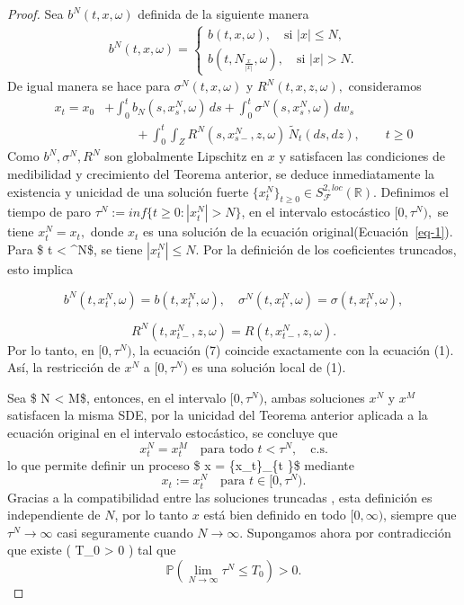 \documentclass[
  spanish,
  us-letterpaper,
]{scrreprt}
\theoremstyle{plain}
\theoremstyle{plain}
\theoremstyle{definition}
\theoremstyle{remark}
\begin{document}
\begin{proof}
Sea \(b^{N}(t,x,\omega)\) definida de la siguiente manera
\[\begin{split}
      b^{N}(t,x,\omega) = \left\lbrace\begin{array}{c}b(t,x,\omega), \quad \text{si }|x|\leq N,
       \\
       b(t,N_{\frac{x}{|x|}},\omega), \quad
       \text{si } |x| > N.\end{array}\right.
\end{split}\] De igual manera se hace para \(\sigma^{N}(t,x,\omega)\) y
\(R^{N}(t,x,z,\omega),\) consideramos \[\begin{split}
x_t = x_0 &+ \int_0^t b_N(s,x^N_s,\omega)\,ds 
           + \int_0^t \sigma^N(s,x^N_s,\omega)\,dw_s \\
          & \ \ \ \ \ \ \ \ \ \ \ +  \int_0^t\!\int_Z R^N(s,x^N_{s-},z,\omega)\,\tilde{N}_t(ds,dz),
          \qquad t\geq 0
\end{split}\] Como \(b^N, \sigma^N, R^N\) son globalmente Lipschitz en
\(x\) y satisfacen las condiciones de medibilidad y crecimiento del
Teorema anterior, se deduce inmediatamente la existencia y unicidad de
una solución fuerte
\(\{x^N_t\}_{t\geq 0}\in S^{2,loc}_{\mathcal{F}}(\mathbb{R})\).
Definimos el tiempo de paro \(\tau^N:=inf\{t\geq0:|x^N_t|> N\}\), en el
intervalo estocástico \([0, \tau^N),\) se tiene \(x^N_t=x_t,\) donde
\(x_t\) es una solución de la ecuación original(Ecuación~\ref{eq-1}).
Para \$ t \textless{} \tau\^{}N\$, se tiene \(|x_t^N| \leq N\). Por la
definición de los coeficientes truncados, esto implica

\[b^N(t,x_t^N,\omega) = b(t,x_t^N,\omega), \quad \sigma^N(t,x_t^N,\omega) = \sigma(t,x_t^N,\omega),\]

\[R^N(t,x_{t-}^N,z,\omega) = R(t,x_{t-}^N,z,\omega).\] Por lo tanto, en
\([0, \tau^N)\), la ecuación (7) coincide exactamente con la ecuación
(1). Así, la restricción de \(x^N\) a \([0, \tau^N)\) es una solución
local de (1).

Sea \$ N \textless{} M\$, entonces, en el intervalo \([0, \tau^N)\),
ambas soluciones \(x^N\) y \(x^M\) satisfacen la misma SDE, por la
unicidad del Teorema anterior aplicada a la ecuación original en el
intervalo estocástico, se concluye que
\[x_t^N = x_t^M \quad \text{para todo } t < \tau^N, \quad \text{c.s.}\]
lo que permite definir un proceso \$ x = \{x\_t\}\_\{t \}\$
mediante \[x_t := x_t^N \quad \text{para } t \in [0, \tau^N).\] Gracias
a la compatibilidad entre las soluciones truncadas , esta definición es
independiente de \(N\), por lo tanto \(x\) está bien definido en todo
\([0, \infty)\), siempre que \(\tau^N \to \infty\) casi seguramente
cuando \(N \to \infty\). Supongamos ahora por contradicción que existe (
T\_0 \textgreater{} 0 ) tal que
\[\mathbb{P}\left( \lim_{N \to \infty} \tau^N \leq T_0 \right) > 0.\]


\end{proof}
\end{document}
